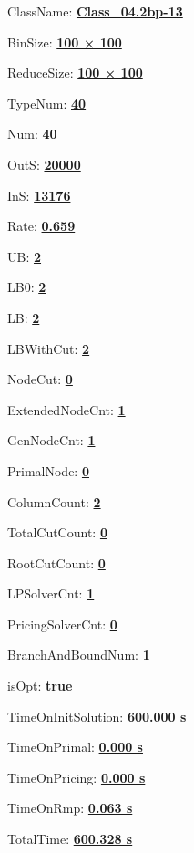 \documentclass[11pt]{article}
\begin{document}
\pagestyle{empty}


ClassName: \underline{\textbf{Class_04.2bp-13}}
\par
BinSize: \underline{\textbf{100 × 100}}
\par
ReduceSize: \underline{\textbf{100 × 100}}
\par
TypeNum: \underline{\textbf{40}}
\par
Num: \underline{\textbf{40}}
\par
OutS: \underline{\textbf{20000}}
\par
InS: \underline{\textbf{13176}}
\par
Rate: \underline{\textbf{0.659}}
\par
UB: \underline{\textbf{2}}
\par
LB0: \underline{\textbf{2}}
\par
LB: \underline{\textbf{2}}
\par
LBWithCut: \underline{\textbf{2}}
\par
NodeCut: \underline{\textbf{0}}
\par
ExtendedNodeCnt: \underline{\textbf{1}}
\par
GenNodeCnt: \underline{\textbf{1}}
\par
PrimalNode: \underline{\textbf{0}}
\par
ColumnCount: \underline{\textbf{2}}
\par
TotalCutCount: \underline{\textbf{0}}
\par
RootCutCount: \underline{\textbf{0}}
\par
LPSolverCnt: \underline{\textbf{1}}
\par
PricingSolverCnt: \underline{\textbf{0}}
\par
BranchAndBoundNum: \underline{\textbf{1}}
\par
isOpt: \underline{\textbf{true}}
\par
TimeOnInitSolution: \underline{\textbf{600.000 s}}
\par
TimeOnPrimal: \underline{\textbf{0.000 s}}
\par
TimeOnPricing: \underline{\textbf{0.000 s}}
\par
TimeOnRmp: \underline{\textbf{0.063 s}}
\par
TotalTime: \underline{\textbf{600.328 s}}
\par
\newpage
\end{document}
